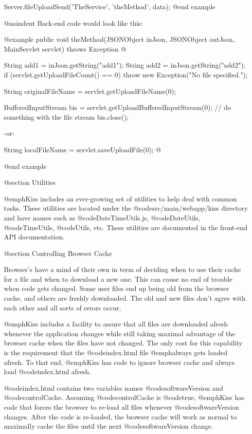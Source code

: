 Server.fileUploadSend('TheService', 'theMethod', data);
@end example

@noindent
Back-end code would look like this:

@example
public void theMethod(JSONObject inJson, JSONObject outJson, MainServlet servlet) throws Exception @{
    String add1 = inJson.getString("add1");
    String add2 = inJson.getString("add2");
    if (servlet.getUploadFileCount() == 0)
        throw new Exception("No file specified.");
        
    String originalFileName = servlet.getUploadFileName(0);
    
    
    BufferedInputStream bis = servlet.getUploadBufferedInputStream(0);
    // do something with the file stream
    bis.close();
    
         -or-
         
    String localFileName = servlet.saveUploadFile(0);
@}
@end example




@section Utilities

@emph{Kiss} includes an ever-growing set of utilities to help deal with common tasks.
These utilities are located under the @code{src/main/webapp/kiss} directory and have names such as
@code{DateTimeUtils.js}, @code{DateUtils}, @code{TimeUtils}, @code{Utils}, etc.  These utilities
are documented in the front-end API documentation.

@section Controlling Browser Cache

Browser's have a mind of their own in term of deciding when to use
their cache for a file and when to download a new one.  This can cause
no end of trouble when code gets changed.  Some user files end up
being old from the browser cache, and others are freshly downloaded.
The old and new files don't agree with each other and all sorts of
errors occur.

@emph{Kiss} includes a facility to assure that all files are
downloaded afresh whenever the application changes while still taking
maximal advantage of the browser cache when the files have not
changed.  The only cost for this capability is the requirement
that the @code{index.html} file @emph{always} gets loaded afresh.
To that end, @emph{Kiss} has code to ignore browser cache and always load
@code{index.html} afresh.

@code{index.html} contains two variables names @code{softwareVersion} and @code{controlCache}.
Assuming @code{controlCache} is @code{true}, @emph{Kiss} has code that forces the browser
to re-load all files whenever @code{softwareVersion} changes.  After the code is re-loaded,
the browser cache will work as normal to maximally cache the files until the next
@code{softwareVersion} change.

